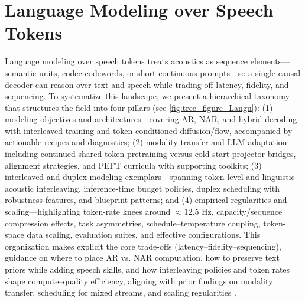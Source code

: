 
















\section{Language Modeling over Speech Tokens} \label{sec:Language Modeling over Speech Tokens}
Language modeling over speech tokens treats acoustics as sequence elements—semantic units, codec codewords, or short continuous prompts—so a single causal decoder can reason over text and speech while trading off latency, fidelity, and sequencing. To systematize this landscape, we present a hierarchical taxonomy that structures the field into four pillars (see \autoref{fig:tree_figure_Langu}): (1) modeling objectives and architectures—covering AR, NAR, and hybrid decoding with interleaved training and token-conditioned diffusion/flow, accompanied by actionable recipes and diagnostics; (2) modality transfer and LLM adaptation—including continued shared-token pretraining versus cold-start projector bridges, alignment strategies, and PEFT curricula with supporting toolkits; (3) interleaved and duplex modeling exemplars—spanning token-level and linguistic–acoustic interleaving, inference-time budget policies, duplex scheduling with robustness features, and blueprint patterns; and (4) empirical regularities and scaling—highlighting token-rate knees around $\approx 12.5$ Hz, capacity/sequence compression effects, task asymmetries, schedule–temperature coupling, token-space data scaling, evaluation suites, and effective configurations. This organization makes explicit the core trade-offs (latency–fidelity–sequencing), guidance on where to place AR vs. NAR computation, how to preserve text priors while adding speech skills, and how interleaving policies and token rates shape compute–quality efficiency, aligning with prior findings on modality transfer, scheduling for mixed streams, and scaling regularities \cite{zeng2024scalingspeechtextpretrainingsyntheticint,wang2025tadicodectextawarediffusionspeechtokeniz}.



